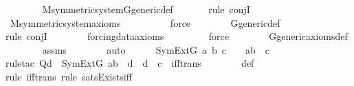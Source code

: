 \begin{isabellebody}
\ \ \ \ \ \ \isamarkupfalse%
\ M{\isacharunderscore}{\kern0pt}symmetric{\isacharunderscore}{\kern0pt}system{\isacharunderscore}{\kern0pt}G{\isacharunderscore}{\kern0pt}generic{\isacharunderscore}{\kern0pt}def\isanewline
\ \ \ \ \ \ \isamarkupfalse%
{\isacharparenleft}{\kern0pt}rule\ conjI{\isacharparenright}{\kern0pt}\isanewline
\ \ \ \ \ \ \isamarkupfalse%
\ M{\isacharunderscore}{\kern0pt}symmetric{\isacharunderscore}{\kern0pt}system{\isacharunderscore}{\kern0pt}axioms\ \isanewline
\ \ \ \ \ \ \ \isamarkupfalse%
\ force\isanewline
\ \ \ \ \ \ \isamarkupfalse%
\ G{\isacharunderscore}{\kern0pt}generic{\isacharunderscore}{\kern0pt}def\isanewline
\ \ \ \ \ \ \isamarkupfalse%
{\isacharparenleft}{\kern0pt}rule\ conjI{\isacharparenright}{\kern0pt}\isanewline
\ \ \ \ \ \ \isamarkupfalse%
\ forcing{\isacharunderscore}{\kern0pt}data{\isacharunderscore}{\kern0pt}axioms\isanewline
\ \ \ \ \ \ \ \isamarkupfalse%
\ force\isanewline
\ \ \ \ \ \ \isamarkupfalse%
\ G{\isacharunderscore}{\kern0pt}generic{\isacharunderscore}{\kern0pt}axioms{\isacharunderscore}{\kern0pt}def\isanewline
\ \ \ \ \ \ \isamarkupfalse%
\ assms{}\isanewline
\ \ \ \ \ \ \isamarkupfalse%
\ auto\isanewline
\isanewline
\ \ \ \ \isamarkupfalse%
\ {\isachardoublequoteopen}{\isacharparenleft}{\kern0pt}SymExt{\isacharparenleft}{\kern0pt}G{\isacharparenright}{\kern0pt}{\isacharcomma}{\kern0pt}\ {\isacharbrackleft}{\kern0pt}a{\isacharcomma}{\kern0pt}\ b{\isacharcomma}{\kern0pt}\ c{\isacharbrackright}{\kern0pt}\ {\isasymTurnstile}\ {\isasymphi}{\isacharparenright}{\kern0pt}\ {\isasymlongleftrightarrow}\ a{\isacharbackquote}{\kern0pt}b\ {\isacharequal}{\kern0pt}\ c{\isachardoublequoteclose}\isanewline
\ \ \ \ \ \ \isamarkupfalse%
{\isacharparenleft}{\kern0pt}rule{\isacharunderscore}{\kern0pt}tac\ Q{\isacharequal}{\kern0pt}{\isachardoublequoteopen}{\isasymexists}d\ {\isasymin}\ SymExt{\isacharparenleft}{\kern0pt}G{\isacharparenright}{\kern0pt}{\isachardot}{\kern0pt}\ a{\isacharbackquote}{\kern0pt}b\ {\isacharequal}{\kern0pt}\ d\ {\isasymand}\ d\ {\isacharequal}{\kern0pt}\ c{\isachardoublequoteclose}\ \ iff{\isacharunderscore}{\kern0pt}trans{\isacharparenright}{\kern0pt}\isanewline
\ \ \ \ \ \ \isamarkupfalse%
\ {\isasymphi}{\isacharunderscore}{\kern0pt}def\isanewline
\ \ \ \ \ \ \ \isamarkupfalse%
{\isacharparenleft}{\kern0pt}rule\ iff{\isacharunderscore}{\kern0pt}trans{\isacharcomma}{\kern0pt}\ rule\ sats{\isacharunderscore}{\kern0pt}Exists{\isacharunderscore}{\kern0pt}iff{\isacharparenright}{\kern0pt}\isanewline

\end{isabellebody}
